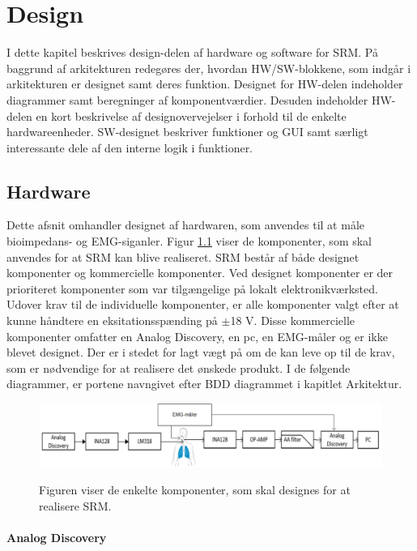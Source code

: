 \chapter{Design}

I dette kapitel beskrives design-delen af hardware og software for SRM. På baggrund af arkitekturen redegøres der, hvordan HW/SW-blokkene, som indgår i arkitekturen er designet samt deres funktion. Designet for HW-delen indeholder diagrammer samt beregninger af komponentværdier. Desuden indeholder HW-delen en kort
beskrivelse af designovervejelser i forhold til de enkelte hardwareenheder. SW-designet beskriver funktioner og GUI samt særligt interessante dele af den interne logik i funktioner. 


\section{Hardware}

Dette afsnit omhandler designet af hardwaren, som anvendes til at måle  bioimpedans- og EMG-siganler. Figur \ref{fig:Blokaede} viser de komponenter, som skal anvendes for at SRM kan blive realiseret. SRM består af både designet komponenter og kommercielle komponenter. Ved designet komponenter er der prioriteret komponenter som var tilgængelige på lokalt elektronikværksted. Udover krav til de individuelle komponenter, er alle komponenter valgt efter at kunne håndtere en eksitationsspænding på $\pm$18 V. Disse kommercielle komponenter omfatter en Analog Discovery, en pc, en EMG-måler og er ikke blevet designet. Der er i stedet for lagt vægt på om de kan leve op til de krav, som er nødvendige for at realisere det ønskede produkt. I de følgende diagrammer, er portene navngivet efter BDD diagrammet i kapitlet Arkitektur.


\begin{figure}[H]
\centering
{\includegraphics[width=\textwidth]
{Figure/Blokaede}}
\caption{Figuren viser de enkelte komponenter, som skal designes for at realisere SRM.}
\label{fig:Blokaede}
\end{figure}

\subsubsection{Analog Discovery}

